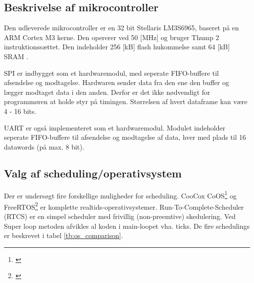 \subsection{Beskrivelse af mikrocontroller}
Den udleverede mikrocontroller er en 32 bit Stellaris LM3S6965, baseret på en ARM Cortex M3 kerne. Den opererer ved 50 [MHz] og bruger Thump 2 instruktionssættet. Den indeholder 256 [kB] flash hukommelse samt 64 [kB] SRAM \citep{lm3s6965}.

SPI er indbygget som et hardwaremodul, med seperate FIFO-buffere til afsendelse og modtagelse. Hardwaren sender data fra den ene den buffer og lægger modtaget data i den anden. Derfor er det ikke nødvendigt for programmøren at holde styr på timingen. Størrelsen af hvert dataframe kan være 4 - 16 bits. 

UART er også implementeret som et hardwaremodul. Modulet indeholder seperate FIFO-buffere til afsendelse og modtagelse af data, hver med plads til 16 datawords (på max. 8 bit). 

\subsection{Valg af scheduling/operativsystem}
Der er undersøgt fire forskellige muligheder for scheduling.
CooCox CoOS\footnote{\citep{www.coocox.com/CoOS.htm}} og FreeRTOS\footnote{\citep{freertos.org}}
er komplette realtids-operativsystemer. 
Run-To-Complete-Scheduler (RTCS) er en simpel scheduler med frivillig (non-preemtive) skedulering.
Ved Super loop metoden afvikles al koden i main-loopet vha. ticks.
De fire schedulings er beskrevet i tabel \ref{tb:os_comparison}.

